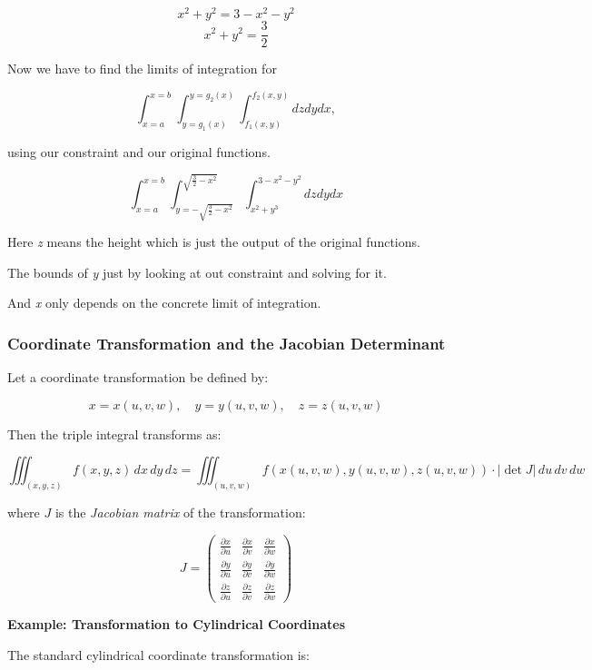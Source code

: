 \[
    x^2 + y^2 = 3 -x^2 - y^2 
\]
\[
    x^2 + y^2 = \frac{3}{2}
\]

Now we have to find the limits of integration for 

\[
    \int_{x=a}^{x=b}\int_{y=g_1(x)}^{y=g_2(x)} \int_{f_1(x,y)}^{f_2(x,y)} dz dy dx,
\]

using our constraint and our original functions.

\[
    \int_{x=a}^{x=b}\int_{y=-\sqrt{\frac{3}{2} - x^2}}^{\sqrt{\frac{3}{2} -x^2}} 
    \int_{x^2 + y^3}^{3-x^2-y^2} dz dy dx
\]

Here \emph{z} means the height which is just the output
of the original functions.

The bounds of \emph{y} just by looking at out constraint and solving for it.

And \emph{x} only depends on the concrete limit of integration.


\subsubsection{Coordinate Transformation and the Jacobian Determinant}

Let a coordinate transformation be defined by:

\[
    x = x(u, v, w), \quad y = y(u, v, w), \quad z = z(u, v, w)
\]

Then the triple integral transforms as:

\[
    \iiint_{(x, y, z)} f(x, y, z)\, dx\, dy\, dz = \iiint_{(u, v, w)} f(x(u, v, w), y(u, v, w), 
    z(u, v, w)) \cdot \left| \det J \right|\, du\, dv\, dw
\]

where \( J \) is the \emph{Jacobian matrix} of the transformation:

\[
    J = 
    \begin{pmatrix}
    \frac{\partial x}{\partial u} & \frac{\partial x}{\partial v} & \frac{\partial x}{\partial w} \\
    \frac{\partial y}{\partial u} & \frac{\partial y}{\partial v} & \frac{\partial y}{\partial w} \\
    \frac{\partial z}{\partial u} & \frac{\partial z}{\partial v} & \frac{\partial z}{\partial w}
    \end{pmatrix}
\]

\textbf{Example: Transformation to Cylindrical Coordinates}
\vspace{\baselineskip}

The standard cylindrical coordinate transformation is:

